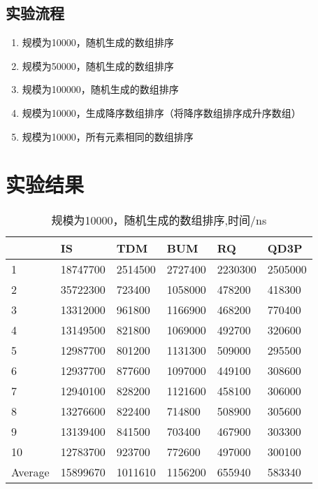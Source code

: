 \documentclass[12pt,a4paper]{ctexart}
\begin{document}
\subsection{实验流程}
\begin{enumerate}
    \item 规模为10000，随机生成的数组排序
    \item 规模为50000，随机生成的数组排序
    \item 规模为100000，随机生成的数组排序
    \item 规模为10000，生成降序数组排序（将降序数组排序成升序数组）
    \item 规模为10000，所有元素相同的数组排序
\end{enumerate}


\section{实验结果}

\begin{table}[H]
    \setlength{\abovecaptionskip}{0cm}
    \setlength{\belowcaptionskip}{0.5cm}
    \small
    \centering
    \caption[short]{规模为10000，随机生成的数组排序,时间/ns}

    \begin{tabular}{|l|l|l|l|l|l|}
        \hline
                & IS       & TDM     & BUM     & RQ      & QD3P    \\ \hline
        1       & 18747700 & 2514500 & 2727400 & 2230300 & 2505000 \\ \hline
        2       & 35722300 & 723400  & 1058000 & 478200  & 418300  \\ \hline
        3       & 13312000 & 961800  & 1166900 & 468200  & 770400  \\ \hline
        4       & 13149500 & 821800  & 1069000 & 492700  & 320600  \\ \hline
        5       & 12987700 & 801200  & 1131300 & 509000  & 295500  \\ \hline
        6       & 12937700 & 877600  & 1097000 & 449100  & 308600  \\ \hline
        7       & 12940100 & 828200  & 1121600 & 458100  & 306000  \\ \hline
        8       & 13276600 & 822400  & 714800  & 508900  & 305600  \\ \hline
        9       & 13139400 & 841500  & 703400  & 467900  & 303300  \\ \hline
        10      & 12783700 & 923700  & 772600  & 497000  & 300100  \\ \hline
        Average & 15899670 & 1011610 & 1156200 & 655940  & 583340  \\ \hline
    \end{tabular}

\end{table}
\end{document}
